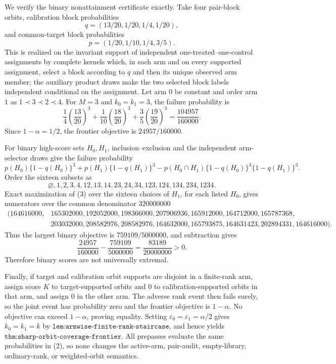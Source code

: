 We verify the binary nonattainment certificate exactly. Take four pair-block orbits, calibration block probabilities
\[
q=(13/20,1/20,1/4,1/20),
\]
and common-target block probabilities
\[
p=(1/20,1/10,1/4,3/5).
\]
This is realized on the invariant support of independent one-treated--one-control assignments by complete kernels which, in each arm and on every supported assignment, select a block according to \(q\) and then its unique observed arm member; the auxiliary product draws make the two selected block labels independent conditional on the assignment. Let arm \(0\) be constant and order arm \(1\) as \(1\prec3\prec2\prec4\). For \(M=3\) and \(k_0=k_1=3\), the failure probability is
\[
\frac14\left(\frac{13}{20}\right)^3+
\frac1{10}\left(\frac{18}{20}\right)^3+
\frac35\left(\frac{19}{20}\right)^3
=\frac{104957}{160000}.
\]
Since \(1-\alpha=1/2\), the frontier objective is \(24957/160000\).

For binary high-score sets \(H_0,H_1\), inclusion--exclusion and the independent arm-selector draws give the failure probability
\[
p(H_0)\{1-q(H_0)\}^3+p(H_1)\{1-q(H_1)\}^3
-p(H_0\cap H_1)\{1-q(H_0)\}^3\{1-q(H_1)\}^3.
\tag{3}
\]
Order the sixteen subsets as
\[
\varnothing,1,2,3,4,12,13,14,23,24,34,123,124,134,234,1234.
\]
Exact maximization of (3) over the sixteen choices of \(H_1\), for each listed \(H_0\), gives numerators over the common denominator \(320000000\)
\[
\begin{split}
(164616000,&165302000,192052000,198366000,207906936,165912000,164712000,165787368,\\
&203032000,208582976,208582976,164632000,165793875,164631423,202894331,164616000).
\end{split}
\]
Thus the largest binary objective is \(759109/5000000\), and subtraction gives
\[
\frac{24957}{160000}-\frac{759109}{5000000}
=\frac{83189}{20000000}>0.
\]
Therefore binary scores are not universally extremal.

Finally, if target and calibration orbit supports are disjoint in a finite-rank arm, assign score \(K\) to target-supported orbits and \(0\) to calibration-supported orbits in that arm, and assign \(0\) in the other arm. The adverse rank event then fails surely, so the joint event has probability zero and the frontier objective is \(1-\alpha\). No objective can exceed \(1-\alpha\), proving equality. Setting \(\varepsilon_0=\varepsilon_1=\alpha/2\) gives \(k_0=k_1=k\) by \(\texttt{lem:armwise-finite-rank-staircase}\), and hence yields \(\texttt{thm:sharp-orbit-coverage-frontier}\). All prepasses evaluate the same probabilities in (2), so none changes the active-arm, pair-audit, empty-library, ordinary-rank, or weighted-orbit semantics.